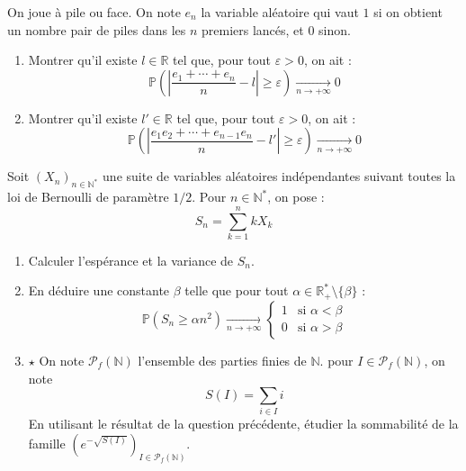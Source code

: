 \documentclass[french,a4paper]{article}
\renewcommand{\P}{\mathbb{P}}
\newcommand{\N}{\mathbb{N}}
\newcommand{\R}{\mathbb{R}}
\newcommand{\st}{^*}
\theoremstyle{plain}
\theoremstyle{definition}
\theoremstyle{remark}
\begin{document}
\begin{ex}{}
	On joue à pile ou face. On note $e_n$ la variable aléatoire qui vaut $1$ si on obtient un nombre pair de piles dans les $n$ premiers lancés, et $0$ sinon.
	\begin{enumerate}
		\item Montrer qu'il existe $l\in\R$ tel que, pour tout $\varepsilon>0$, on ait : $$\P\left(\left\lvert\frac{e_1+\cdots+e_n}{n}-l\right\rvert\geqslant\varepsilon\right)\xrightarrow[n\to+\infty]{}0$$
		\item Montrer qu'il existe $l'\in\R$ tel que, pour tout $\varepsilon>0$, on ait : $$\P\left(\left\lvert\frac{e_1e_2+\cdots+e_{n-1}e_n}{n}-l'\right\rvert\geqslant\varepsilon\right)\xrightarrow[n\to+\infty]{}0$$
	\end{enumerate}
\end{ex}

\begin{ex}{}
	Soit $(X_n)_{n\in\N\st}$ une suite de variables aléatoires indépendantes suivant toutes la loi de Bernoulli de paramètre $1/2$. Pour $n\in\N\st$, on pose : $$S_n=\sum_{k=1}^{n}kX_k$$
	\begin{enumerate}
		\item Calculer l'espérance et la variance de $S_n$.
		\item En déduire une constante $\beta$ telle que pour tout $\alpha\in\R_+\st\setminus\{\beta\}$ : $$\P(S_n\geqslant\alpha n^2)\xrightarrow[n\to+\infty]{}\begin{cases}
			1&\text{si }\alpha<\beta\\
			0&\text{si }\alpha>\beta
		\end{cases}$$
		\item $\star$ On note $\mathcal{P}_f(\N)$ l'ensemble des parties finies de $\N$. pour $I\in\mathcal{P}_f(\N)$, on note $$S(I)=\sum_{i\in I}i$$ En utilisant le résultat de la question précédente, étudier la sommabilité de la famille $\displaystyle\left(e^{-\sqrt{S(I)}}\right)_{I\in\mathcal{P}_f(\N)}$.
	\end{enumerate}
\end{ex}
\end{document}
